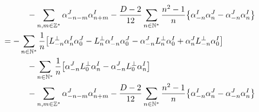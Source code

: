 \begin{align*}
    &\quad\quad\quad-\sum\limits_{n,m\in\mathbb Z^\ast}\alpha_{-n-m}^J\alpha^I_{n+m}-\frac{D-2}{12}\sum\limits_{n\in\mathbb N^\ast}\frac{n^2-1}{n}\qty{\alpha^I_{-n}\alpha^J_n-\alpha^J_{-n}\alpha^I_n}\\
    &=-\sum\limits_{n\in\mathbb N^\ast}\frac1n\qty[L^\perp_{-n}\alpha_n^I\alpha_0^J-L^\perp_{n}\alpha_{-n}^I\alpha_0^J-\alpha_{-n}^JL^\perp_{n}\alpha^I_0+\alpha_{n}^JL^\perp_{-n}\alpha^I_0]\\
    &\quad\quad\quad-\sum\limits_{n\in\mathbb N^\ast}\frac1n\qty[\alpha^J_{-n}L^\perp_0\alpha_n^I-\alpha_{-n}^JL^\perp_0\alpha^I_{n}]\\
    &\quad\quad\quad-\sum\limits_{n,m\in\mathbb Z^\ast}\alpha_{-n-m}^J\alpha^I_{n+m}-\frac{D-2}{12}\sum\limits_{n\in\mathbb N^\ast}\frac{n^2-1}{n}\qty{\alpha^I_{-n}\alpha^J_n-\alpha^J_{-n}\alpha^I_n}
\end{align*}

